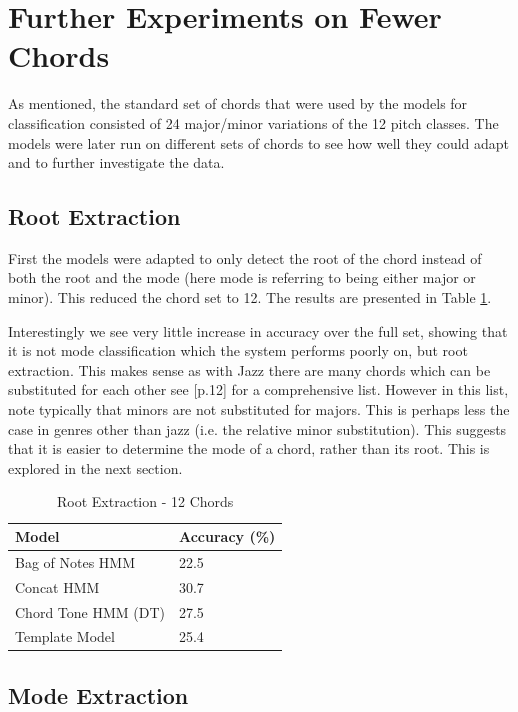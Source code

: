 \documentclass[bsc,singlespacing,parskip,deptreport,twoside,frontabs]{infthesis}
\begin{document}
\section{Further Experiments on Fewer Chords}

As mentioned, the standard set of chords that were used by the models for classification consisted of 24 major/minor variations of the 12 pitch classes. The models were later run on different sets of chords to see how well they could adapt and to further investigate the data.

\subsection{Root Extraction}

First the models were adapted to only detect the root of the chord instead of both the root and the mode (here mode is referring to being either major or minor). This reduced the chord set to 12. The results are presented in Table \ref{12}.

Interestingly we see very little increase in accuracy over the full set, showing that it is not mode classification which the system performs poorly on, but root extraction. This makes sense as with Jazz there are many chords which can be substituted for each other see \cite{granroth2014robust}[p.12] for a comprehensive list. However in this list, note typically that minors are not substituted for majors. This is perhaps less the case in genres other than jazz (i.e. the relative minor substitution). This suggests that it is easier to determine the mode of a chord, rather than its root. This is explored in the next section.

\begin{table}
\centering
\caption{Root Extraction - 12 Chords}
\label{12}
\begin{tabular}{l|l}
Model               & Accuracy (\%) \\ \hline
Bag of Notes HMM    & 22.5           \\
Concat HMM          & 30.7          \\
Chord Tone HMM (DT) & 27.5          \\
Template Model      & 25.4         
\end{tabular}
\end{table}

\subsection{Mode Extraction}
\end{document}
